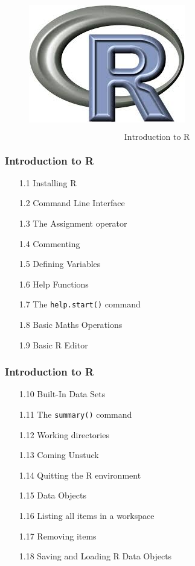 \documentclass{beamer}
\begin{document}
 
 \begin{figure}
 \centering
 \includegraphics[width=0.9\linewidth]{Rlogo}
 \end{figure}
 \[ \mbox{Introduction to R} \]
 
 

 
 
 \frametitle{Introduction to R}
 \begin{itemize}
 \item[1.1] Installing R      
 \item[1.2] Command Line Interface     
 \item[1.3] The Assignment operator     
 \item[1.4] Commenting      
 \item[1.5] Defining Variables     
 \item[1.6] Help Functions      
 \item[1.7] The \texttt{help.start()} command     
 \item[1.8] Basic Maths Operations     
 \item[1.9] Basic R Editor      
 \end{itemize}
 
 
 
 \frametitle{Introduction to R}
 \begin{itemize}
 \item[1.10] Built-In Data Sets      
 \item[1.11] The \texttt{summary()} command     
 \item[1.12] Working directories      
 \item[1.13] Coming Unstuck    
 \item[1.14] Quitting the R environment   
 \item[1.15] Data Objects  
 \item[1.16] Listing all items in a workspace     
 \item[1.17] Removing items   
 \item[1.18] Saving and Loading R Data Objects    
 \end{itemize}
 
\end{document}
